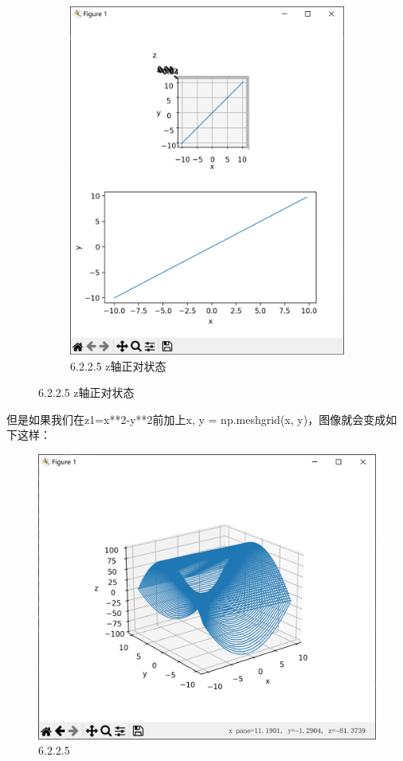 \documentclass[12pt]{article}
\begin{document}
\begin{figure}[H]
\begin{subfigure}[b]{0.4\textwidth}
        \includegraphics[width=\textwidth]{3D mesh Pic2.2.png} %
        \caption{6.2.2.5 z轴正对状态}
        \label{fig:line-graph2-pic2}
    \end{subfigure}
\end{figure}
但是如果我们在z1=x**2-y**2前加上x, y = np.meshgrid(x, y)，图像就会变成如下这样：
\begin{figure}[H]
    \centering
    \includegraphics[width=0.5\linewidth]{3D mesh Pic2.3.png}
    \caption{6.2.2.5}
    \label{fig:enter-label}
\end{figure}
\end{document}
